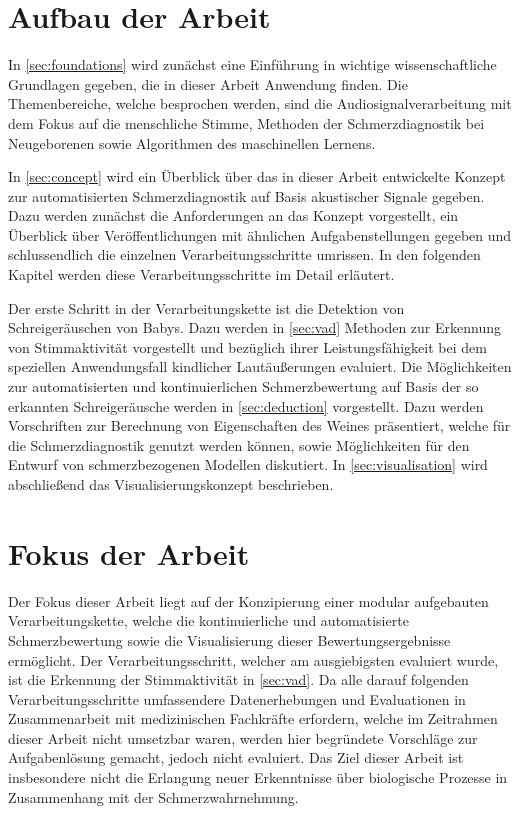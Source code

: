 \section{Aufbau der Arbeit}

In \autoref{sec:foundations} wird zunächst eine Einführung in wichtige wissenschaftliche Grundlagen gegeben, die in dieser Arbeit Anwendung finden. Die Themenbereiche, welche besprochen werden, sind die Audiosignalverarbeitung mit dem Fokus auf die menschliche Stimme, Methoden der Schmerzdiagnostik bei Neugeborenen sowie Algorithmen des maschinellen Lernens. 

In \autoref{sec:concept} wird ein Überblick über das in dieser Arbeit entwickelte Konzept zur automatisierten Schmerzdiagnostik auf Basis akustischer Signale gegeben. Dazu werden zunächst die Anforderungen an das Konzept vorgestellt, ein Überblick über Veröffentlichungen mit ähnlichen Aufgabenstellungen gegeben und schlussendlich die einzelnen Verarbeitungsschritte umrissen. In den folgenden Kapitel werden diese Verarbeitungsschritte im Detail erläutert. 

Der erste Schritt in der Verarbeitungskette ist die Detektion von Schreigeräuschen von Babys. Dazu werden in \autoref{sec:vad} Methoden zur Erkennung von Stimmaktivität vorgestellt und bezüglich ihrer Leistungsfähigkeit bei dem speziellen Anwendungsfall kindlicher Lautäußerungen evaluiert. Die Möglichkeiten zur automatisierten und kontinuierlichen Schmerzbewertung auf Basis der so erkannten Schreigeräusche werden in \autoref{sec:deduction} vorgestellt. Dazu werden Vorschriften zur Berechnung von Eigenschaften des Weines präsentiert, welche für die Schmerzdiagnostik genutzt werden können, sowie Möglichkeiten für den Entwurf von schmerzbezogenen Modellen diskutiert. In \autoref{sec:visualisation} wird abschließend das Visualisierungskonzept beschrieben.

\section{Fokus der Arbeit}

Der Fokus dieser Arbeit liegt auf der Konzipierung einer modular aufgebauten Verarbeitungskette, welche die kontinuierliche und automatisierte Schmerzbewertung sowie die Visualisierung dieser Bewertungsergebnisse ermöglicht. Der Verarbeitungsschritt, welcher am ausgiebigsten evaluiert wurde, ist die Erkennung der Stimmaktivität in \autoref{sec:vad}. Da alle darauf folgenden Verarbeitungsschritte umfassendere Datenerhebungen und Evaluationen in Zusammenarbeit mit medizinischen Fachkräfte erfordern, welche im Zeitrahmen dieser Arbeit nicht umsetzbar waren, werden hier begründete Vorschläge zur Aufgabenlösung gemacht, jedoch nicht evaluiert. Das Ziel dieser Arbeit ist insbesondere nicht die Erlangung neuer Erkenntnisse über biologische Prozesse in Zusammenhang mit der Schmerzwahrnehmung.
